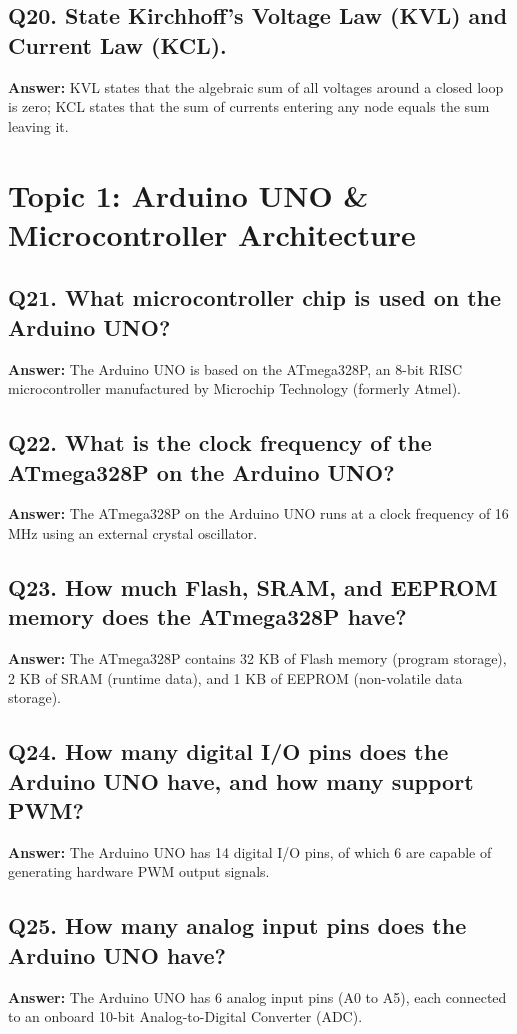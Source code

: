 \documentclass[12pt,a4paper,oneside]{report}
\begin{document}
\section{Q20. State Kirchhoff's Voltage Law (KVL) and Current Law (KCL).}
\textbf{Answer:} KVL states that the algebraic sum of all voltages around a closed loop is zero; KCL states that the sum of currents entering any node equals the sum leaving it.

\chapter{Topic 1: Arduino UNO \& Microcontroller Architecture}

\section{Q21. What microcontroller chip is used on the Arduino UNO?}
\textbf{Answer:} The Arduino UNO is based on the ATmega328P, an 8-bit RISC microcontroller manufactured by Microchip Technology (formerly Atmel).

\section{Q22. What is the clock frequency of the ATmega328P on the Arduino UNO?}
\textbf{Answer:} The ATmega328P on the Arduino UNO runs at a clock frequency of 16 MHz using an external crystal oscillator.

\section{Q23. How much Flash, SRAM, and EEPROM memory does the ATmega328P have?}
\textbf{Answer:} The ATmega328P contains 32 KB of Flash memory (program storage), 2 KB of SRAM (runtime data), and 1 KB of EEPROM (non-volatile data storage).

\section{Q24. How many digital I/O pins does the Arduino UNO have, and how many support PWM?}
\textbf{Answer:} The Arduino UNO has 14 digital I/O pins, of which 6 are capable of generating hardware PWM output signals.

\section{Q25. How many analog input pins does the Arduino UNO have?}
\textbf{Answer:} The Arduino UNO has 6 analog input pins (A0 to A5), each connected to an onboard 10-bit Analog-to-Digital Converter (ADC).
\end{document}
